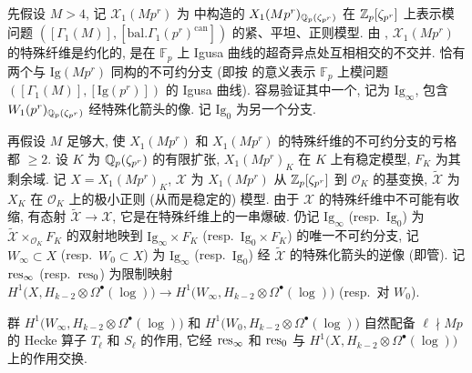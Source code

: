 先假设 $M > 4$, 记 $\mathcal{X}_1(Mp^{r})$ 为 \cite{ref:36} 中构造的 $X_1(Mp^{r})_{\mathbb{Q}_p(\zeta_{p^{r}})}$ 在 $\mathbb{Z}_p[\zeta_{p^{r}}]$ 上表示模问题 $([\Gamma_1(M)],[\mathrm{bal.}\Gamma_1(p^{r})^{\mathrm{can}}])$ 的紧、平坦、正则模型.
由 \cite[\S13.12]{ref:36}, $\mathcal{X}_1(Mp^{r})$ 的特殊纤维是约化的, 是在 $\mathbb{F}_p$ 上 Igusa 曲线的超奇异点处互相相交的不交并.
恰有两个与 $\mathrm{Ig}(Mp^{r})$ 同构的不可约分支 (即按 \cite[\S12]{ref:36} 的意义表示 $\mathbb{F}_p$ 上模问题 $([\Gamma_1(M)],[\mathrm{Ig}(p^{r})])$ 的 Igusa 曲线).
容易验证其中一个, 记为 $\mathrm{Ig}_{\infty}$, 包含 $W_1(p^{r})_{\mathbb{Q}_p(\zeta_{p^{r}})}$ 经特殊化箭头的像.
记 $\mathrm{Ig}_0$ 为另一个分支.

再假设 $M$ 足够大, 使 $X_1(Mp^{r})$ 和 $X_1(Mp^{r})$ 的特殊纤维的不可约分支的亏格都 $\ge 2$.
设 $K$ 为 $\mathbb{Q}_p(\zeta_{p^{r}})$ 的有限扩张, $X_1(Mp^{r})_K$ 在 $K$ 上有稳定模型, $F_K$ 为其剩余域.
记 $X = X_1(Mp^{r})_K$, $\mathcal{X}$ 为 $X_1(Mp^{r})$ 从 $\mathbb{Z}_p[\zeta_{p^{r}}]$ 到 $\mathcal{O}_K$ 的基变换, $\widetilde{\mathcal{X}}$ 为 $X_K$ 在 $\mathcal{O}_K$ 上的极小正则 (从而是稳定的) 模型.
由于 $\mathcal{X}$ 的特殊纤维中不可能有收缩, 有态射 $\widetilde{\mathcal{X}} \to \mathcal{X}$, 它是在特殊纤维上的一串爆破.
仍记 $\mathrm{Ig}_{\infty}$ (resp.\ $\mathrm{Ig}_0$) 为 $\widetilde{\mathcal{X}} \times_{\mathcal{O}_K} F_K$ 的双射地映到 $\mathrm{Ig}_{\infty} \times F_K$ (resp.\ $\mathrm{Ig}_0 \times F_K$) 的唯一不可约分支, 记 $W_{\infty} \subset X$ (resp.\ $W_0 \subset X$) 为 $\mathrm{Ig}_{\infty}$ (resp.\ $\mathrm{Ig}_0$) 经 $\widetilde{\mathcal{X}}$ 的特殊化箭头的逆像 (即管).
记 $\operatorname{res}_{\infty}$ (resp.\ $\operatorname{res}_0$) 为限制映射 $H^{1}\bigl(X,H_{k-2} \otimes \Omega^{\bullet}(\log)\bigr) \to H^{1}\bigl(W_{\infty},H_{k-2} \otimes \Omega^{\bullet}(\log)\bigr)$ (resp.\ 对 $W_0$).

\begin{lemma}\label{lem:4.4.1}
群 $H^{1}\bigl(W_{\infty},H_{k-2} \otimes \Omega^{\bullet}(\log)\bigr)$ 和 $H^{1}\bigl(W_0,H_{k-2} \otimes \Omega^{\bullet}(\log)\bigr)$ 自然配备 $\ell \nmid Mp$ 的 Hecke 算子 $T_{\ell}$ 和 $S_{\ell}$ 的作用, 它经 $\operatorname{res}_{\infty}$ 和 $\operatorname{res}_0$ 与 $H^{1}\bigl(X,H_{k-2} \otimes \Omega^{\bullet}(\log)\bigr)$ 上的作用交换.
\end{lemma}

